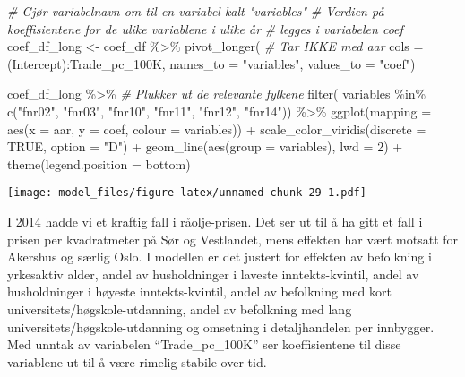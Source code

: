 \documentclass[
]{article}
\newenvironment{Shaded}{\begin{snugshade}}{\end{snugshade}}
\newcommand{\AttributeTok}[1]{\textcolor[rgb]{0.77,0.63,0.00}{#1}}
\newcommand{\CommentTok}[1]{\textcolor[rgb]{0.56,0.35,0.01}{\textit{#1}}}
\newcommand{\ConstantTok}[1]{\textcolor[rgb]{0.00,0.00,0.00}{#1}}
\newcommand{\DecValTok}[1]{\textcolor[rgb]{0.00,0.00,0.81}{#1}}
\newcommand{\FunctionTok}[1]{\textcolor[rgb]{0.00,0.00,0.00}{#1}}
\newcommand{\NormalTok}[1]{#1}
\newcommand{\OtherTok}[1]{\textcolor[rgb]{0.56,0.35,0.01}{#1}}
\newcommand{\SpecialCharTok}[1]{\textcolor[rgb]{0.00,0.00,0.00}{#1}}
\newcommand{\StringTok}[1]{\textcolor[rgb]{0.31,0.60,0.02}{#1}}
\begin{document}
\begin{Shaded}
\begin{Highlighting}[]
\CommentTok{\# Gjør variabelnavn om til en variabel kalt "variables"}
\CommentTok{\# Verdien på koeffisientene for de ulike variablene i ulike år}
\CommentTok{\# legges i variabelen coef}
\NormalTok{coef\_df\_long }\OtherTok{\textless{}{-}}\NormalTok{ coef\_df }\SpecialCharTok{\%\textgreater{}\%}
   \FunctionTok{pivot\_longer}\NormalTok{(}
     \CommentTok{\# Tar IKKE med aar}
     \AttributeTok{cols =} \StringTok{\textasciigrave{}}\AttributeTok{(Intercept)}\StringTok{\textasciigrave{}}\SpecialCharTok{:}\StringTok{\textasciigrave{}}\AttributeTok{Trade\_pc\_100K}\StringTok{\textasciigrave{}}\NormalTok{,}
     \AttributeTok{names\_to =} \StringTok{"variables"}\NormalTok{,}
     \AttributeTok{values\_to =} \StringTok{"coef"}\NormalTok{)}
\end{Highlighting}
\end{Shaded}

\begin{Shaded}
\begin{Highlighting}[]
\NormalTok{coef\_df\_long }\SpecialCharTok{\%\textgreater{}\%} 
  \CommentTok{\# Plukker ut de relevante fylkene}
  \FunctionTok{filter}\NormalTok{(}
\NormalTok{    variables }\SpecialCharTok{\%in\%} \FunctionTok{c}\NormalTok{(}\StringTok{"fnr02"}\NormalTok{, }\StringTok{"fnr03"}\NormalTok{, }\StringTok{"fnr10"}\NormalTok{, }\StringTok{"fnr11"}\NormalTok{, }\StringTok{"fnr12"}\NormalTok{, }\StringTok{"fnr14"}\NormalTok{)) }\SpecialCharTok{\%\textgreater{}\%} 
 \FunctionTok{ggplot}\NormalTok{(}\AttributeTok{mapping =} \FunctionTok{aes}\NormalTok{(}\AttributeTok{x =}\NormalTok{ aar, }\AttributeTok{y =}\NormalTok{ coef, }\AttributeTok{colour =}\NormalTok{ variables)) }\SpecialCharTok{+}
 \FunctionTok{scale\_color\_viridis}\NormalTok{(}\AttributeTok{discrete =} \ConstantTok{TRUE}\NormalTok{, }\AttributeTok{option =} \StringTok{"D"}\NormalTok{) }\SpecialCharTok{+}
  \FunctionTok{geom\_line}\NormalTok{(}\FunctionTok{aes}\NormalTok{(}\AttributeTok{group =}\NormalTok{ variables), }\AttributeTok{lwd =} \DecValTok{2}\NormalTok{) }\SpecialCharTok{+} 
  \FunctionTok{theme}\NormalTok{(}\AttributeTok{legend.position =} \StringTok{\textquotesingle{}bottom\textquotesingle{}}\NormalTok{)}
\end{Highlighting}
\end{Shaded}

\texttt{[image: model\_files/figure-latex/unnamed-chunk-29-1.pdf]}

I 2014 hadde vi et kraftig fall i råolje-prisen. Det ser ut til å ha
gitt et fall i prisen per kvadratmeter på Sør og Vestlandet, mens
effekten har vært motsatt for Akershus og særlig Oslo. I modellen er det
justert for effekten av befolkning i yrkesaktiv alder, andel av
husholdninger i laveste inntekts-kvintil, andel av husholdninger i
høyeste inntekts-kvintil, andel av befolkning med kort
universitets/høgskole-utdanning, andel av befolkning med lang
universitets/høgskole-utdanning og omsetning i detaljhandelen per
innbygger. Med unntak av variabelen ``Trade\_pc\_100K'' ser
koeffisientene til disse variablene ut til å være rimelig stabile over
tid.
\end{document}
